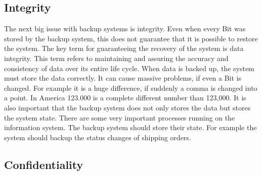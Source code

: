 \documentclass[12pt]{article}
\begin{document}
\subsection{Integrity}
The next big issue with backup systems is integrity.  Even when every Bit was stored by the backup system, this does not guarantee that it is possible to restore the system. The key term for guaranteeing the recovery of the system is data integrity.
\newline
\newline
This term refers to maintaining and assuring the accuracy and consistency of data over its entire life cycle. When data is backed up, the system must store the data correctly. It can cause massive problems, if even a Bit is changed.  For example it is a huge difference, if suddenly a comma is changed into a point. In America 123.000 is a complete different number than 123,000.
\newline
\newline
It is also important that the backup system does not only stores the data but stores the system state. There are some very important processes running on the information system. The backup system should store their state. For example the system should backup the status changes of shipping orders.
\subsection{Confidentiality}
\end{document}
